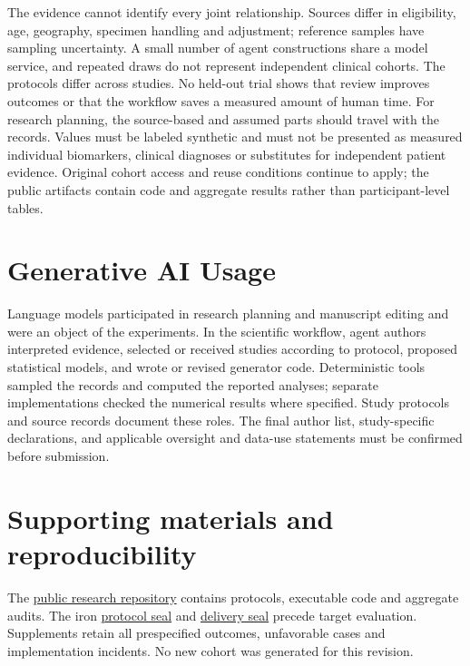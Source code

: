 \documentclass[11pt,letterpaper]{article}
\begin{document}
The evidence cannot identify every joint relationship. Sources differ in eligibility, age, geography, specimen handling and adjustment; reference samples have sampling uncertainty. A small number of agent constructions share a model service, and repeated draws do not represent independent clinical cohorts. The protocols differ across studies. No held-out trial shows that review improves outcomes or that the workflow saves a measured amount of human time. For research planning, the source-based and assumed parts should travel with the records. Values must be labeled synthetic and must not be presented as measured individual biomarkers, clinical diagnoses or substitutes for independent patient evidence. Original cohort access and reuse conditions continue to apply; the public artifacts contain code and aggregate results rather than participant-level tables.


\section{Generative AI Usage}

Language models participated in research planning and manuscript editing and were an object of the experiments. In the scientific workflow, agent authors interpreted evidence, selected or received studies according to protocol, proposed statistical models, and wrote or revised generator code. Deterministic tools sampled the records and computed the reported analyses; separate implementations checked the numerical results where specified. Study protocols and source records document these roles. The final author list, study-specific declarations, and applicable oversight and data-use statements must be confirmed before submission.


\section*{Supporting materials and reproducibility}

The \href{https://github.com/ziwang11112/evidence-guided-virtual-cohorts-2026}{public research repository} contains protocols, executable code and aggregate audits. The iron \href{https://github.com/ziwang11112/evidence-guided-virtual-cohorts-2026/commit/bedd845768c1c938768f58fce685f53cbf97f3df}{protocol seal} and \href{https://github.com/ziwang11112/evidence-guided-virtual-cohorts-2026/commit/c88192edeb0bc63b60d0bfe6e3a7282ced9d2975}{delivery seal} precede target evaluation. Supplements retain all prespecified outcomes, unfavorable cases and implementation incidents. No new cohort was generated for this revision.
\end{document}
